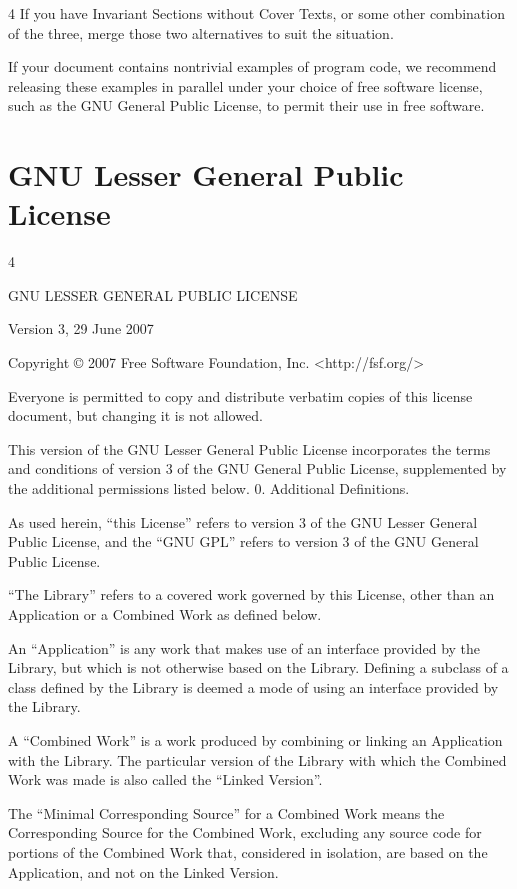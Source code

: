 \documentclass[fontsize=11pt,paper=A4,BCOR=12mm,DIV=13,open=any,listof=totoc,toc=flat]{scrbook}
\begin{document}
{\begin{multicols}{4}
If you have Invariant Sections without Cover Texts, or some other combination of the three, merge those two alternatives to suit the situation.

If your document contains nontrivial examples of program code, we recommend releasing these examples in parallel under your choice of free software license, such as the GNU General Public License, to permit their use in free software.
\end{multicols}

\section{GNU Lesser General Public License}
\begin{multicols}{4}


GNU LESSER GENERAL PUBLIC LICENSE

Version 3, 29 June 2007

Copyright © 2007 Free Software Foundation, Inc. <http://fsf.org/>

Everyone is permitted to copy and distribute verbatim copies of this license document, but changing it is not allowed.

This version of the GNU Lesser General Public License incorporates the terms and conditions of version 3 of the GNU General Public License, supplemented by the additional permissions listed below.
0. Additional Definitions.

As used herein, “this License” refers to version 3 of the GNU Lesser General Public License, and the “GNU GPL” refers to version 3 of the GNU General Public License.

“The Library” refers to a covered work governed by this License, other than an Application or a Combined Work as defined below.

An “Application” is any work that makes use of an interface provided by the Library, but which is not otherwise based on the Library. Defining a subclass of a class defined by the Library is deemed a mode of using an interface provided by the Library.

A “Combined Work” is a work produced by combining or linking an Application with the Library. The particular version of the Library with which the Combined Work was made is also called the “Linked Version”.

The “Minimal Corresponding Source” for a Combined Work means the Corresponding Source for the Combined Work, excluding any source code for portions of the Combined Work that, considered in isolation, are based on the Application, and not on the Linked Version.


\end{multicols}}
\end{document}
